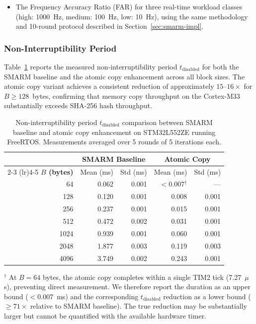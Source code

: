 \documentclass[a4paper,10pt]{article}
\begin{document}
{\begin{itemize}
    \item The Frequency Accuracy Ratio (FAR) for three real-time 
    workload classes (high: 1000~Hz, medium: 100~Hz, low: 10~Hz), 
    using the same methodology and 10-round protocol described 
    in Section~\ref{sec:smarm-impl}.
\end{itemize}

\subsubsection{Non-Interruptibility Period}
\label{sec:atomic-tdisabled}

Table~\ref{tab:tdisabled_comparison} reports the measured 
non-interruptibility period $t_{\mathrm{disabled}}$ for both the 
SMARM baseline and the atomic copy enhancement across all block 
sizes. The atomic copy variant achieves a consistent reduction of 
approximately $15$--$16\times$ for $B \geq 128$~bytes, confirming 
that memory copy throughput on the Cortex-M33 substantially 
exceeds SHA-256 hash throughput.

\begin{table}[h]
\centering
\caption{Non-interruptibility period $t_{\mathrm{disabled}}$ 
comparison between SMARM baseline and atomic copy enhancement 
on STM32L552ZE running FreeRTOS. Measurements averaged over 
5 rounds of 5 iterations each.}
\label{tab:tdisabled_comparison}
\begin{tabular}{rrrrr}
\toprule
& \multicolumn{2}{c}{\textbf{SMARM Baseline}} 
& \multicolumn{2}{c}{\textbf{Atomic Copy}} \\
\cmidrule(lr){2-3} \cmidrule(lr){4-5}
\textbf{$B$ (bytes)} 
& Mean (ms) & Std (ms) 
& Mean (ms) & Std (ms) \\
\midrule
64    & 0.062 & 0.001 & $<$0.007$^\dagger$ & --- \\
128   & 0.120 & 0.001 & 0.008 & 0.001 \\
256   & 0.237 & 0.001 & 0.015 & 0.001 \\
512   & 0.472 & 0.002 & 0.031 & 0.001 \\
1024  & 0.939 & 0.001 & 0.060 & 0.001 \\
2048  & 1.877 & 0.003 & 0.119 & 0.003 \\
4096  & 3.749 & 0.002 & 0.243 & 0.001 \\
\bottomrule
\end{tabular}

\smallskip
\footnotesize
$^\dagger$ At $B = 64$ bytes, the atomic copy completes within a 
single TIM2 tick (7.27~$\mu$s), preventing direct measurement. 
We therefore report the duration as an upper bound 
($< 0.007$~ms) and the corresponding $t_{\mathrm{disabled}}$ 
reduction as a lower bound ($\geq 71\times$ relative to SMARM 
baseline). The true reduction may be substantially larger but 
cannot be quantified with the available hardware timer.
\end{table}

}
\end{document}
